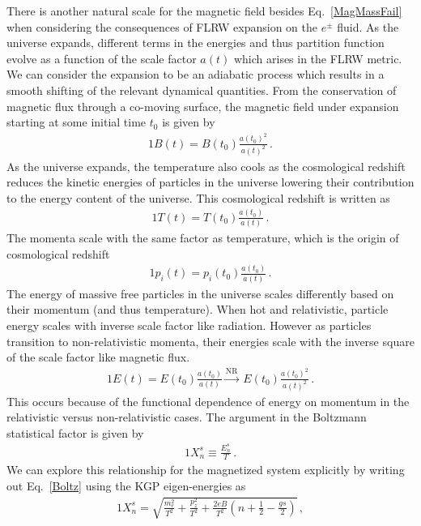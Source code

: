 \documentclass[Universe,article,submit,moreauthors,pdftex]{Definitions/mdpi}
\newcommand*{\req}[1]{Eq.~{\eqref{#1}}}
\begin{document}
There is another natural scale for the magnetic field besides \req{MagMassFail} when considering the consequences of FLRW expansion on the $e^{\pm}$ fluid. As the universe expands, different terms in the energies and thus partition function evolve as a function of the scale factor $a(t)$ which arises in the FLRW metric. We can consider the expansion to be an adiabatic process which results in a smooth shifting of the relevant dynamical quantities. From the conservation of magnetic flux through a co-moving surface, the magnetic field under expansion starting at some initial time $t_{0}$ is given by
\begin{alignat}{1}
    \label{BScale} B(t) = B(t_{0})\frac{a(t_{0})^{2}}{a(t)^{2}}\,.
\end{alignat}
As the universe expands, the temperature also cools as the cosmological redshift reduces the kinetic energies of particles in the universe lowering their contribution to the energy content of the universe. This cosmological redshift is written as
\begin{alignat}{1}
    \label{TScale} T(t) = T(t_{0})\frac{a(t_{0})}{a(t)}\,.
\end{alignat}
The momenta scale with the same factor as temperature, which is the origin of cosmological redshift
\begin{alignat}{1}
    \label{PScale} p_{i}(t) = p_{i}(t_{0})\frac{a(t_{0})}{a(t)}\,.
\end{alignat}
The energy of massive free particles in the universe scales differently based on their momentum (and thus temperature). When hot and relativistic, particle energy scales with inverse scale factor like radiation. However as particles transition to non-relativistic momenta, their energies scale with the inverse square of the scale factor like magnetic flux.
\begin{alignat}{1}
    \label{EScale} E(t) = E(t_{0})\frac{a(t_{0})}{a(t)}\xrightarrow{\mathrm{NR}}\  E(t_{0})\frac{a(t_{0})^{2}}{a(t)^{2}}\,.
\end{alignat}
This occurs because of the functional dependence of energy on momentum in the relativistic versus non-relativistic cases. The argument in the Boltzmann statistical factor is given by
\begin{alignat}{1}
    \label{Boltz} X_{n}^{s}\equiv\frac{E_{n}^{s}}{T}\,.
\end{alignat}
We can explore this relationship for the magnetized system explicitly by writing out \req{Boltz} using the KGP eigen-energies as
\begin{alignat}{1}
    \label{XExplicit} X_{n}^{s} = \sqrt{\frac{m_{e}^{2}}{T^{2}}+\frac{p_{z}^{2}}{T^{2}}+\frac{2eB}{T^{2}}\left(n+\frac{1}{2}-\frac{gs}{2}\right)}\,,
\end{alignat}
\end{document}
